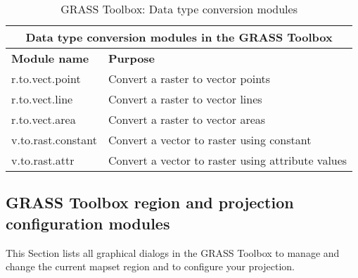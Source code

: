 \begin{table}[ht]
\centering
\caption{GRASS Toolbox: Data type conversion modules}\medskip
 \begin{tabular}{|p{4cm}|p{12cm}|}
  \hline \multicolumn{2}{|c|}{\textbf{Data type conversion modules in the GRASS
  Toolbox}} \\
  \hline \textbf{Module name} & \textbf{Purpose} \\
  \hline r.to.vect.point & Convert a raster to vector points \\
  \hline r.to.vect.line & Convert a raster to vector lines \\
  \hline r.to.vect.area & Convert a raster to vector areas \\
  \hline v.to.rast.constant & Convert a vector to raster using constant \\
  \hline v.to.rast.attr & Convert a vector to raster using attribute values \\
\hline
\end{tabular}
\end{table}

\newpage

\subsection{GRASS Toolbox region and projection configuration modules}

This Section lists all graphical dialogs in the GRASS Toolbox to manage and
change the current mapset region and to configure your projection.

